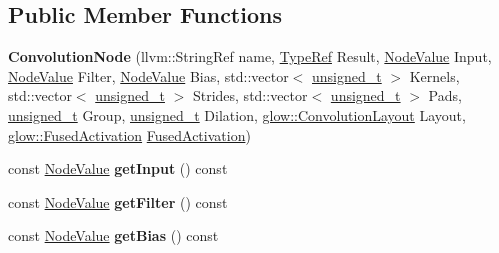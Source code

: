 \subsection*{Public Member Functions}
\begin{DoxyCompactItemize}
\item 
\mbox{\label{classglow_1_1_convolution_node_aea4811ed055de0a00fc5ad1a72d25432}} 
{\bfseries Convolution\+Node} (llvm\+::\+String\+Ref name, \hyperlink{structglow_1_1_type}{Type\+Ref} Result, \hyperlink{structglow_1_1_node_value}{Node\+Value} Input, \hyperlink{structglow_1_1_node_value}{Node\+Value} Filter, \hyperlink{structglow_1_1_node_value}{Node\+Value} Bias, std\+::vector$<$ \hyperlink{namespaceglow_a0ca574644e1e42ef193a9947fb4d8911}{unsigned\+\_\+t} $>$ Kernels, std\+::vector$<$ \hyperlink{namespaceglow_a0ca574644e1e42ef193a9947fb4d8911}{unsigned\+\_\+t} $>$ Strides, std\+::vector$<$ \hyperlink{namespaceglow_a0ca574644e1e42ef193a9947fb4d8911}{unsigned\+\_\+t} $>$ Pads, \hyperlink{namespaceglow_a0ca574644e1e42ef193a9947fb4d8911}{unsigned\+\_\+t} Group, \hyperlink{namespaceglow_a0ca574644e1e42ef193a9947fb4d8911}{unsigned\+\_\+t} Dilation, \hyperlink{namespaceglow_aa2f3a33e05699df0f42295c5c4bd1f77}{glow\+::\+Convolution\+Layout} Layout, \hyperlink{namespaceglow_ae88f2cc9ccac93130ee1cc326d968a21}{glow\+::\+Fused\+Activation} \hyperlink{namespaceglow_ae88f2cc9ccac93130ee1cc326d968a21}{Fused\+Activation})
\item 
\mbox{\label{classglow_1_1_convolution_node_af60ee5560c960878759e2365fe923808}} 
const \hyperlink{structglow_1_1_node_value}{Node\+Value} {\bfseries get\+Input} () const
\item 
\mbox{\label{classglow_1_1_convolution_node_a16ec087a7ae64f24b36c9ea071a3dab8}} 
const \hyperlink{structglow_1_1_node_value}{Node\+Value} {\bfseries get\+Filter} () const
\item 
\mbox{\label{classglow_1_1_convolution_node_aa859356b69c04b83500ac508d5684268}} 
const \hyperlink{structglow_1_1_node_value}{Node\+Value} {\bfseries get\+Bias} () const
\item 
\mbox{\label{classglow_1_1_convolution_node_ae70d8600a442a1381a47f6093dd97f23}} 

\end{DoxyCompactItemize}
